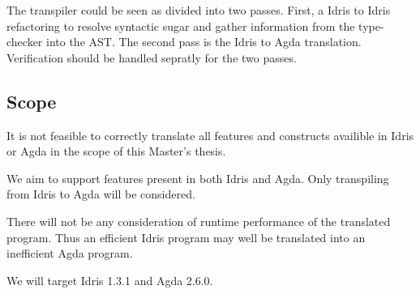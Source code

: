 
The transpiler could be seen as divided into two passes. First, a Idris to
Idris refactoring to resolve syntactic sugar and gather information from the
type-checker into the AST. The second pass is the Idris to Agda translation.
Verification should be handled sepratly for the two passes.


\subsection{Scope}

It is not feasible to correctly translate all features and constructs availible
in Idris or Agda in the scope of this Master's thesis.

We aim to support features present in both Idris and Agda.
Only transpiling from Idris to Agda will be considered.


There will not be any consideration of runtime performance of the translated
program.  Thus an efficient Idris program may well be translated into an
inefficient Agda program.

We will target Idris 1.3.1 and Agda 2.6.0.

